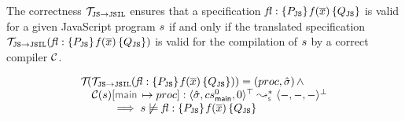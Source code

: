 The correctness $\mathcal{T}_{\mathtt{JS}\rightarrow\mathtt{JSIL}}$ ensures that 
%
 a \javert  specification ${\mathit{fl}} : \{ P_{\mathtt{JS}} \} \, \mathit{f}(\overline{x}) \, \{ Q_{\mathtt{JS}} \}$
is valid for a given JavaScript program $s$ if and only if the translated specification 
$\mathcal{T}_{\mathtt{JS}\rightarrow\mathtt{JSIL}}({\mathit{fl}} : \{ P_{\mathtt{JS}} \} \, \mathit{f}(\overline{x}) \, \{ Q_{\mathtt{JS}} \})$ is valid 
for the compilation of $s$ by a correct compiler $\mathcal{C}$. 

\begin{corollary}\label{teo:bug:finding:sl:javert}
$$
\begin{array}{l}
\testify{}(\jsspeccomp(\specsig{\pass_\jssubscript}{\pid(\jvec{x})}{\qass_\jssubscript}{\flag}))  = (\proc, \sstate) \, \wedge \\
\quad
  \compile(\jstmt)[\jsilmain \mapsto \proc] :  \transabssemrule{\sstate, \csmain, 0}{-, -, -}{\top}{\bot}{\symbolic} \\ \quad \qquad 
    \implies  
         \jstmt \not\satisfies \specsig{\pass_\jssubscript}{\pid(\jvec{x})}{\qass_\jssubscript}{\flag}
\end{array}
$$
\end{corollary}






%
%
%



